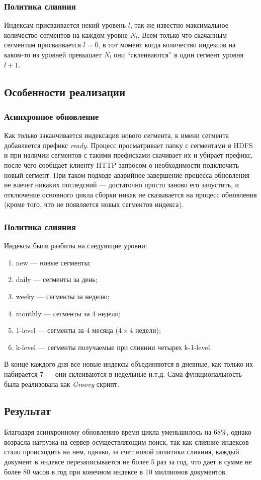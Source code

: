 \subsubsection{Политика слияния}
Индексам присваивается некий уровень $l$, так же известно максимальное количество сегментов на каждом уровне $N_{l}$. Всем только что скачанным сегментам присваивается $l=0$, в тот момент когда количество индексов на каком-то из уровней превышает $N_{l}$ они ``склеиваются'' в один сегмент уровня $l+1$.
\subsection{Особенности реализации}
\subsubsection{Асинхронное обновление}
Как только заканчивается индексация нового сегмента, к имени сегмента добавляется префикс \textit{ready}. Процесс просматривает папку с сегментами в HDFS и при наличии сегментов с такими префисками скачивает их и убирает префикс, после чего сообщает клиенту HTTP запросом о необходимости подключить новый сегмент. При таком подходе аварийное завершение процесса обновления не влечет никаких последсвий --- достаточно просто заново его запустить, и отключение основного цикла сборки никак не сказывается на процесс обновления (кроме того, что не появляется новых сегментов индекса).
\subsubsection{Политика слияния}
Индексы были разбиты на следующие уровни:
\begin{enumerate}
 \item new --- новые сегменты;
 \item daily --- сегменты за день;
 \item weeky --- сегменты за неделю;
 \item monthly --- сегменты за 4 недели;
 \item 1-level --- сегменты за 4 месяца ($4\times4$ недели);
 \item k-level --- сегменты получаемые при слиянии четырех k-1-level.
\end{enumerate}
В конце каждого дня все новые индексы объединяются в дневные, как только их набирается 7 --- они склеиваются в недельные и.т.д. Сама функциональность была реализована как \textit{Groovy} скрипт.
\subsection{Результат}
Благодаря асинхронному обновлению время цикла уменьшилось на 68\%, однако возрасла нагрузка на сервер осуществляющим поиск, так как слияние индексов стало происходить на нем, однако, за счет новой политики слияния, каждый документ в индексе перезаписывается не более 5 раз за год, что дает в сумме не более 80 часов в год при конечном индексе в 10 миллионов документов.
 
